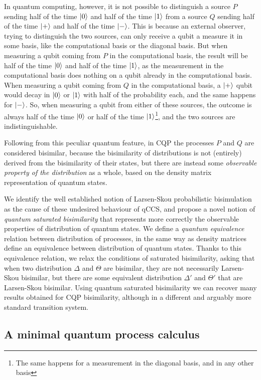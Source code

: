In quantum computing, however, it is not possible to distinguish a source $P$ sending half of the time $\ket{0}$ and half of the time $\ket{1}$ from a source $Q$ sending half of the time $\ket{+}$ and half of the time $\ket{-}$. This is because an external observer, trying to distinguish the two sources, can only receive a qubit a measure it in some basis, like the computational basis or the diagonal basis. But when measuring a qubit coming from $P$ in the computational basis, the result will be half of the time $\ket{0}$ and half of the time $\ket{1}$, as the measurement in the computational basis does nothing on a qubit already in the computational basis. When measuring a qubit coming from $Q$ in the computational basis, a $\ket{+}$ qubit would decay in $\ket{0}$ or $\ket{1}$ with half of the probability each, and the same happens for $\ket{-}$. So, when measuring a qubit from either of these sources, the outcome is always half of the time $\ket{0}$ or half of the time $\ket{1}$\footnote{The same happens for a measurement in the diagonal basis, and in any other basis }, and the two sources are indistinguishable. 

Following from this peculiar quantum feature, in CQP the processes $P$ and $Q$ are considered bisimilar, because the bisimilarity of distributions is not (entirely) derived from the bisimilarity of their states, but there are instead some \textit{observable property of the distribution} as a whole, based on the density matrix representation of quantum states.

We identify the well established notion of Larsen-Skou probabilistic bisimulation  as the cause of these undesired behaviour of qCCS, and propose a novel notion of \textit{quantum saturated bisimilarity} that represents more correctly the observable properties of distribution of quantum states. We define a \textit{quantum equivalence} relation between distribution of processes, in the same way as density matrices define an equivalence between distribution of quantum states. Thanks to this equivalence relation, we relax the conditions of saturated bisimilarity, asking that when two distribution $\Delta$ and $\Theta$ are bisimilar, they are not necessarily Larsen-Skou bisimilar, but there are some equivalent distribution $\Delta'$ and $\Theta'$ that are Larsen-Skou bisimilar. Using quantum saturated bisimilarity we can recover many results obtained for CQP bisimilarity, although in a different and arguably more standard transition system.
 
 \subsection*{A minimal quantum process calculus}
 
